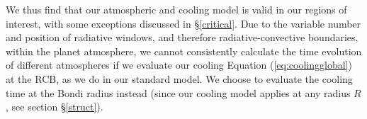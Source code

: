 \documentclass[apj]{emulateapj}
\newcommand{\delad}{\nabla_{\rm ad}}
\newcommand{\delrad}{\nabla_{\rm rad}}
\newcommand{\cb}{_{\rm RCB}}
\begin{document}
%
%
%
%

We thus find that our atmospheric and cooling model is valid in our regions of interest, with some exceptions discussed in \S\ref{critical}. Due to the variable number and position of radiative windows, and therefore radiative-convective boundaries, within the planet atmosphere, we cannot consistently calculate the time evolution of different atmospheres if we evaluate our cooling Equation (\ref{eq:coolingglobal}) at the RCB, as we do in our standard model. We choose to evaluate the cooling time at the Bondi radius instead (since our cooling model applies at any radius $R$, see section \S\ref{struct}). %
\end{document}
